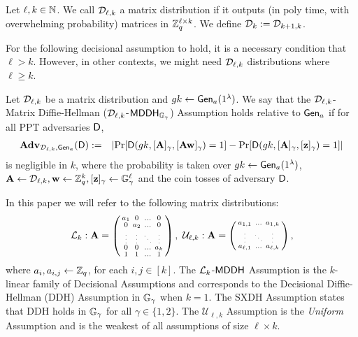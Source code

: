 
\begin{definition}   \label{def:matrixdef}
Let $\ell,k \in \mathbb{N}$.
We call $\mathcal{D}_{\ell,k}$ a matrix distribution if it outputs (in poly time, with overwhelming probability) matrices in $\mathbb{Z}_q^{\ell \times k}$. We define $\mathcal{D}_k := \mathcal{D}_{k+1,k}$. 
\end{definition}

For the following decisional assumption to hold, it is a necessary condition that $\ell>k$. However, in other contexts, we might need $\mathcal{D}_{\ell,k}$ distributions where 
$\ell \geq k$. 

\begin{definition}\label{def:mdh}
Let $\mathcal{D}_{\ell,k}$ be a matrix distribution  and ${gk}\gets \mathsf{Gen}_a(1^\lambda)$. We say that the $\mathcal{D}_{\ell,k}$-Matrix Diffie-Hellman ($\mathcal{D}_{\ell,k}$-$\mathsf{MDDH}_{\mathbb{G}_\gamma}$)
Assumption holds relative to $\mathsf{Gen}_a$ if for all PPT adversaries $\mathsf{D}$,
\begin{eqnarray*}
\mathbf{Adv}_{\mathcal{D}_{\ell,k},\mathsf{Gen}_a}(\mathsf{D}) & := &
    \left|
        \Pr[\mathsf{D}({gk},[\mathbf{{A}}]_\gamma,[\mathbf{{A}}\mathbf{w}]_\gamma)=1]-
        \Pr[\mathsf{D}({gk},[\mathbf{{A}}]_\gamma, [\mathbf{z}]_\gamma) =1]
    \right|
\end{eqnarray*}
is negligible in $k$,
where the probability is taken over ${gk} \gets \mathsf{Gen}_a(1^\lambda)$, $\mathbf{{A}} \gets \mathcal{D}_{\ell,k}, \mathbf{w} \gets \mathbb{Z}_q^k, [\mathbf{z}]_\gamma  \gets \mathbb{G}_\gamma^{\ell}$ and the coin tosses of adversary $\mathsf{D}$.
\end{definition}
 

In this paper we will refer to the following matrix distributions: 
\[
\distlin_{k}:\matrA = \left( \begin{smallmatrix}
    a_1 & 0 &  \ldots & 0 \\
    0 &  a_2 &  \ldots & 0\\
    \tiny{\vdots} &  \tiny{\vdots}  &  \tiny{\ddots} & \tiny{\vdots} \\
    0 & 0 &  \ldots  & a_{k}\\
    1 & 1 & \ldots & 1
\end{smallmatrix} \right),
\ 
\mathcal{U}_{\ell,k}: \matrA = \left( \begin{smallmatrix}
    a_{1,1} &  \ldots & a_{1,k}  \\
    \tiny{\vdots} & \tiny{\ddots}  & \tiny{\vdots} \\
    a_{\ell,1} &  \ldots &  a_{\ell,k} 
\end{smallmatrix} \right),
\]
where $a_i,a_{i,j}\leftarrow \mathbb{Z}_q$, for each $i,j\in[k]$.  The $\mathcal{L}_{k}$-$\mathsf{MDDH}$ Assumption is the $k$-linear family of Decisional Assumptions
\cite{C:HofKil07,cryptoeprint:2007:074} and corresponds to 
 the Decisional Diffie-Hellman (DDH)
Assumption in $\mathbb{G}_\gamma$ when $k=1$. The SXDH Assumption states that DDH holds in $\mathbb{G}_\gamma$ for all $\gamma \in \{1,2\}$. The $\mathcal{U}_{\ell,k}$ Assumption is the \textit{Uniform} Assumption and is the weakest of all assumptions of size $\ell \times k$. 

